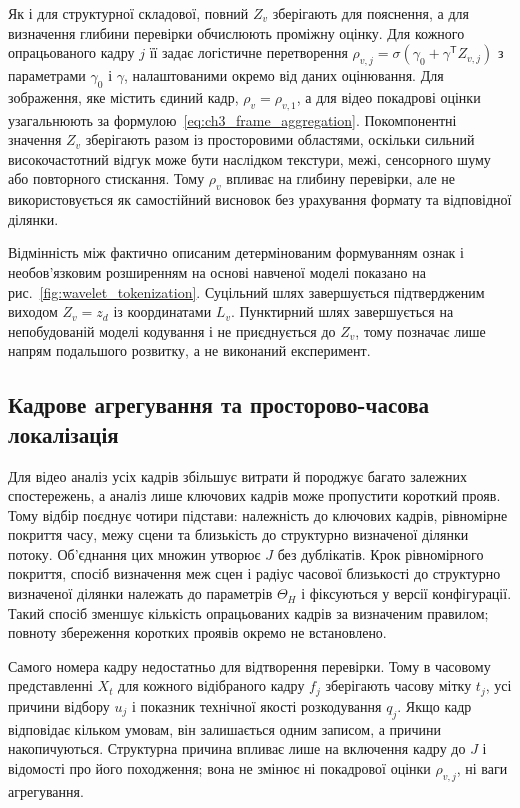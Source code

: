 Як і для структурної складової, повний $Z_v$ зберігають для пояснення, а для визначення глибини перевірки обчислюють проміжну оцінку. Для кожного опрацьованого кадру $j$ її задає логістичне перетворення $\rho_{v,j}=\sigma(\gamma_0+\gamma^{\mathsf T}Z_{v,j})$ з параметрами $\gamma_0$ і $\gamma$, налаштованими окремо від даних оцінювання. Для зображення, яке містить єдиний кадр, $\rho_v=\rho_{v,1}$, а для відео покадрові оцінки узагальнюють за формулою~\eqref{eq:ch3_frame_aggregation}. Покомпонентні значення $Z_v$ зберігають разом із просторовими областями, оскільки сильний високочастотний відгук може бути наслідком текстури, межі, сенсорного шуму або повторного стискання. Тому $\rho_v$ впливає на глибину перевірки, але не використовується як самостійний висновок без урахування формату та відповідної ділянки.

Відмінність між фактично описаним детермінованим формуванням ознак і необов’язковим розширенням на основі навченої моделі показано на рис.~\ref{fig:wavelet_tokenization}. Суцільний шлях завершується підтвердженим виходом $Z_v=z_d$ із координатами $L_v$. Пунктирний шлях завершується на непобудованій моделі кодування і не приєднується до $Z_v$, тому позначає лише напрям подальшого розвитку, а не виконаний експеримент.



\subsection{Кадрове агрегування та просторово-часова локалізація}

Для відео аналіз усіх кадрів збільшує витрати й породжує багато залежних спостережень, а аналіз лише ключових кадрів може пропустити короткий прояв. Тому відбір поєднує чотири підстави: належність до ключових кадрів, рівномірне покриття часу, межу сцени та близькість до структурно визначеної ділянки потоку. Об’єднання цих множин утворює $J$ без дублікатів. Крок рівномірного покриття, спосіб визначення меж сцен і радіус часової близькості до структурно визначеної ділянки належать до параметрів $\Theta_H$ і фіксуються у версії конфігурації. Такий спосіб зменшує кількість опрацьованих кадрів за визначеним правилом; повноту збереження коротких проявів окремо не встановлено.

Самого номера кадру недостатньо для відтворення перевірки. Тому в часовому представленні $X_t$ для кожного відібраного кадру $f_j$ зберігають часову мітку $t_j$, усі причини відбору $u_j$ і показник технічної якості розкодування $q_j$. Якщо кадр відповідає кільком умовам, він залишається одним записом, а причини накопичуються. Структурна причина впливає лише на включення кадру до $J$ і відомості про його походження; вона не змінює ні покадрової оцінки $\rho_{v,j}$, ні ваги агрегування.

